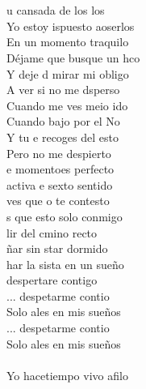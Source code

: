 \begin{cancion}[Despertar][Estopa]%
{}\vspace*{-0.4cm}\\
	            \\
	   u cansada de los los\\
	 Yo estoy ispuesto aoserlos\\
	    En un momento traquilo\\
	Déjame que busque un hco\\
	Y deje d mirar mi obligo\\
	   A ver si no me dsperso\\
	    Cuando me ves meio ido\\
	Cuando bajo por el No\\
	Y tu e recoges del esto\\
	    Pero no me despierto\\
	e momentoes perfecto\\
	 activa e sexto sentido\\
	 ves que o te contesto\\
	s que esto solo conmigo\\
	lir del cmino recto\\
	ñar sin star dormido\\
	har la sista en un sueño\\
	 despertare contigo\\
	... despetarme contio\\
	Solo ales en mis sueños\\
	... despetarme contio\\
	Solo ales en mis sueños\\
	       \\
	  Yo hacetiempo vivo afilo\\

\end{cancion}
